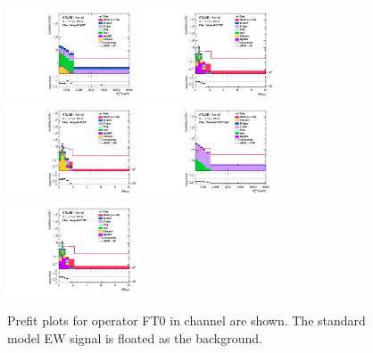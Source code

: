 \begin{figure}[ht]
    \centering
    	\includegraphics[width=0.35\textwidth]{figures/aQGC/Region_distMTagJets_DCRVjetMer_BMin0_J0_incJet1_L0_T0_incFat1_Y6051_incTag1_Fat1_Prefitlog.pdf}
    	\includegraphics[width=0.35\textwidth]{figures/aQGC/Region_distMtvvJ_DSRVBSHP_BMin0_J0_incJet1_L0_T0_incFat1_Y6051_incTag1_Fat1_Prefitlog.pdf}
    	\includegraphics[width=0.35\textwidth]{figures/aQGC/Region_distMtvvJ_DSRVBSLP_BMin0_J0_incJet1_L0_T0_incFat1_Y6051_incTag1_Fat1_Prefitlog.pdf}
    	\includegraphics[width=0.35\textwidth]{figures/aQGC/Region_distMTagResJets_DCRVjetFid_BMin0_T0_Y6051_incTag1_J2_L2_incJet1_Prefitlog.pdf}
    	\includegraphics[width=0.35\textwidth]{figures/aQGC/Region_distMtvvJ_DSRVBSHP_BMin0_J0_incJet1_L0_T0_incFat1_Y6051_incTag1_Fat1_Prefitlog.pdf}
        \caption{Prefit plots for operator FT0 in \zlep channel are shown. The standard model EW signal is floated as the background.}
        \label{fig:0lepFT0}
\end{figure}

